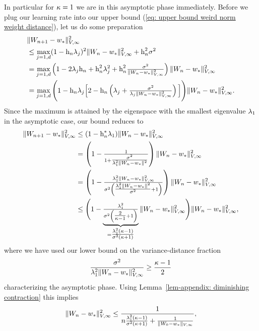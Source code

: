 In particular for \(\kappa=1\) we are in this asymptotic phase immediately.
Before we plug our learning rate into our upper bound (\ref{eq: upper bound
weird norm weight distance}), let us do some preparation 
\begin{align}
	\nonumber
	&\|W_{n+1} -w_*\|_{V,\infty}^2\\
	\nonumber
	&\le \max_{j=1,d} (1-\text{h}_n\lambda_j)^2\|W_n -w_*\|_{V,\infty}^2
	+ \text{h}_n^2 \sigma^2\\
	\label{eq: upper bound useful for rate of convergence}
	&= \max_{j=1,d}\left(1- 2\lambda_j\text{h}_n + \text{h}_n^2\lambda_j^2
		+\text{h}_n^2\tfrac{\sigma^2}{\|W_n-w_*\|_{V,\infty}^2}
	\right)\|W_n-w_*\|_{V,\infty}^2\\
	\nonumber
	&= \max_{j=1,d}\Bigg(1- \text{h}_n \lambda_j\Big[2 - \text{h}_n \left(
		\lambda_j + \tfrac{\sigma^2}{\lambda_j\|W_n-w_*\|_{V,\infty}^2}
	\right)\Big] \Bigg)\|W_n-w_*\|_{V,\infty}^2.
\end{align}
Since the maximum is attained by the eigenspace with the smallest eigenvalue \(\lambda_1\)
in the asymptotic case, our bound reduces to
\begin{align*}
	\|W_{n+1} -w_*\|_{V,\infty}^2
	&\le (1- \text{h}_n^* \lambda_1)\|W_n-w_*\|_{V,\infty}^2\\
	&= \left(1- \tfrac{1}{1+ \tfrac{\sigma^2}{\lambda_1^2\|W_n-w_*\|^2}}\right)
	\|W_n-w_*\|_{V,\infty}^2\\
	&= \left(1- \tfrac{
		\lambda_1^2 \|W_n-w_*\|_{V,\infty}^2
	}{
		\sigma^2
		\left(\tfrac{\lambda_1^2\|W_n-w_*\|^2}{\sigma^2}+1\right)
	}\right)
	\|W_n-w_*\|_{V,\infty}^2\\
	&\le \Bigg(
	1- \underbrace{\tfrac{
		\lambda_1^2
	}{
		\sigma^2
		\left(\tfrac{2}{\kappa -1}+1\right)
	}}_{=\tfrac{\lambda_1^2(\kappa-1)}{\sigma^2(\kappa+1)}}
	\|W_n-w_*\|_{V,\infty}^2
	\Bigg)
	\|W_n-w_*\|_{V,\infty}^2,
\end{align*}
where we have used our lower bound on the variance-distance fraction
\begin{align*}
	\frac{\sigma^2}{
		\lambda_1^2\|W_n-w_*\|_{V,\infty}^2
	}
	\ge \frac{\kappa-1}{2}
\end{align*}
characterizing the asymptotic phase. Using Lemma~\ref{lem-appendix: diminishing contraction}
this implies
\begin{align*}
	\|W_n-w_*\|_{V,\infty}^2
	\le \frac{1}{
		n\tfrac{\lambda_1^2(\kappa-1)}{\sigma^2(\kappa+1)}
		+ \tfrac{1}{\|W_0-w_*\|_{V,\infty}}
	},
\end{align*}
